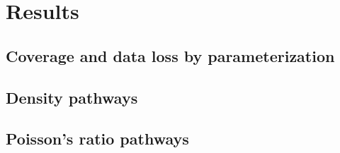 \documentclass[hess, manuscript]{copernicus}
\begin{document}





\section{Results}

\subsection{Coverage and data loss by parameterization}


\subsection{Density pathways}





\subsection{Poisson's ratio pathways}


\end{document}
